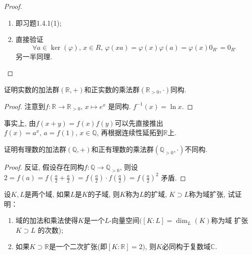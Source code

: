 \documentclass{../solutions-cn}
\begin{document}
\begin{proof}
\begin{enumerate}[(1)]
    \item 即习题1.4.1(1);
    \item 直接验证\[
        \forall a \in \ker(\varphi),\, x \in R,\, \varphi(xa) = \varphi(x)\varphi(a) = \varphi(x)0_{R'} = 0_{R'}
    \]
    另一半同理.
\end{enumerate}
\end{proof}

\begin{exercise}[习题1.4.5]
    证明实数的加法群$(\mathbb{R}, +)$和正实数的乘法群$(\mathbb{R}_{>0}, \cdot)$同构.
\end{exercise}

\begin{proof}
    注意到$f: \mathbb{R} \to \mathbb{R}_{>0},\, x \mapsto e^x$
是同构. $f^{-1}(x) = \ln x$.
\end{proof}

\begin{remark}
    事实上, 由$f(x + y) = f(x)f(y)$可以先直接推出
$f(x) = a^x,\, a = f(1),\, x \in \mathbb{Q}$, 再根据连续性延拓到$\mathbb{R}$上.
\end{remark}

\begin{exercise}[习题1.4.6]
    证明有理数的加法群$(\mathbb{Q}, +)$和正有理数的乘法群$(\mathbb{Q}_{>0}, \cdot)$不同构.
\end{exercise}

\begin{proof}
    反证, 假设存在同构$f: \mathbb{Q} \to \mathbb{Q}_{>0}$,
则设$2 = f(a) = f(\frac{a}{2} + \frac{a}{2}) = f(\frac{a}{2}) \cdot f(\frac{a}{2}) = f(\frac{a}{2})^2$
矛盾.
\end{proof}

\begin{exercise}[习题1.4.9]
    设$K, L$是两个域, 如果$L$是$K$的子域, 则$K$称为$L$的扩域,
$K \supset L$称为域扩张, 试证明：
\begin{enumerate}[(1)]
    \item 域的加法和乘法使得$K$是一个$L$-向量空间$([K:L] = \dim_L(K)$称为域
扩张$K \supset L$ 的次数);
    \item 如果$K \supset \mathbb{R}$是一个二次扩张(即$[K:\mathbb{R}] = 2)$,
则$K$必同构于复数域$\mathbb{C}$.
\end{enumerate}
\end{exercise}
\end{document}
